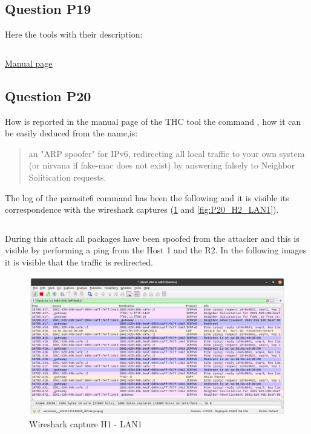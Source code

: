\subsection{Question P19}
Here the tools with their description:
\inputminted{text}{files/P19_THC_toolkit.txt}
\label{log:thc_tool}

\href{https://manpages.debian.org/testing/thc-ipv6/index.html}{Manual page}

\subsection{Question P20}
How is reported in the manual page of the THC tool the command , how it can be easily deduced from the name,is: \begin{quotation} an "ARP spoofer" for IPv6, redirecting all local traffic to your own system (or nirvana if fake-mac does not exist) by answering falsely to Neighbor Solitication requests.
\end{quotation}


The log of the parasite6 command has been the following and it is visible its correspondence with the wireshark captures (\ref{fig:P20_H1_LAN2} and \ref{fig:P20_H2_LAN1}).

\inputminted{text}{files/P20_parasite_log.txt}
\label{log:parasite6}
 
During this attack all packages have been spoofed from the attacker and this is visible by performing a ping from the Host 1 and the R2. In the following images it is visible that the traffic is redirected.
\begin{figure}[H]
	\centering
	\includegraphics[width=\linewidth]{images/P20_1.png}
	\caption{Wireshark capture H1 - LAN1}
	\label{fig:P20_H1_LAN2}
\end{figure}

